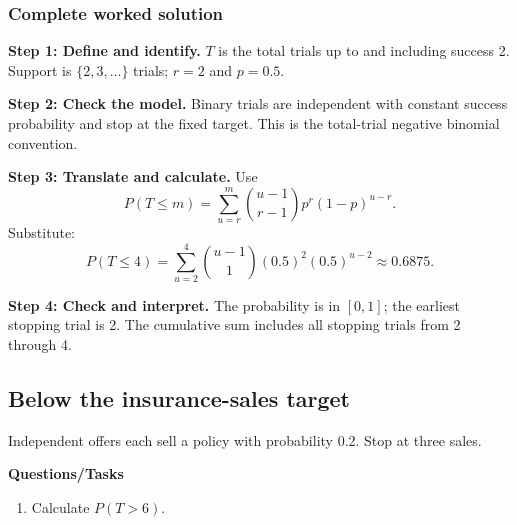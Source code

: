 \subsubsection*{Complete worked solution}
\par\noindent\begin{minipage}{\linewidth}
\textbf{Step 1: Define and identify.} $T$ is the total trials up to and including success 2. Support is $\{2,3,\ldots\}$ trials; $r=2$ and $p=0.5$.
\end{minipage}\par\medskip
\par\noindent\begin{minipage}{\linewidth}
\textbf{Step 2: Check the model.} Binary trials are independent with constant success probability and stop at the fixed target. This is the total-trial negative binomial convention.
\end{minipage}\par\medskip
\par\noindent\begin{minipage}{\linewidth}
\textbf{Step 3: Translate and calculate.} Use
\[P(T\leq m)=\sum_{u=r}^{m}\binom{u-1}{r-1}p^r(1-p)^{u-r}.\]
Substitute:
\[P(T\leq4)=\sum_{u=2}^{4}\binom{u-1}{1}(0.5)^2(0.5)^{u-2}\approx 0.6875.\]
\end{minipage}\par\medskip
\par\noindent\begin{minipage}{\linewidth}
\textbf{Step 4: Check and interpret.} The probability is in $[0,1]$; the earliest stopping trial is 2. The cumulative sum includes all stopping trials from 2 through 4. 
\end{minipage}\par\medskip
{}
\subsection{Below the insurance-sales target}
Independent offers each sell a policy with probability 0.2. Stop at three sales.

\textbf{Questions/Tasks}
\begin{enumerate}
\item Calculate $P(T>6)$. 
\end{enumerate}
